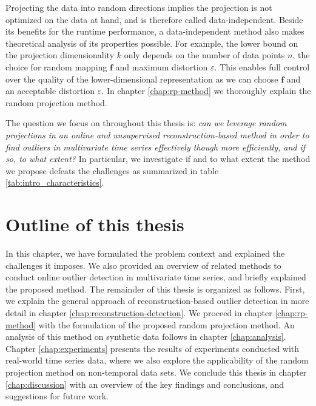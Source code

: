 Projecting the data into random directions implies the projection is not optimized on the data at hand, and is therefore called data-independent. Beside its benefits for the runtime performance, a data-independent method also makes theoretical analysis of its properties possible. For example, the lower bound on the projection dimensionality $k$ only depends on the number of data points $n$, the choice for random mapping $\mathbf{f}$ and maximum distortion $\varepsilon$. This enables full control over the quality of the lower-dimensional representation as we can choose $\mathbf{f}$ and an acceptable distortion $\varepsilon$. In chapter \ref{chap:rp-method} we thoroughly explain the random projection method.

The question we focus on throughout this thesis is: \textit{can we leverage random projections in an online and unsupervised reconstruction-based method in order to find outliers in multivariate time series effectively though more efficiently, and if so, to what extent?} 
In particular, we investigate if and to what extent the method we propose defeats the challenges as summarized in table \ref{tab:intro_characteristics}.


\section{Outline of this thesis}

In this chapter, we have formulated the problem context and explained the challenges it imposes. We also provided an overview of related methods to conduct online outlier detection in multivariate time series, and briefly explained the proposed method. The remainder of this thesis is organized as follows. First, we explain the general approach of reconstruction-based outlier detection in more detail in chapter \ref{chap:reconstruction-detection}. We proceed in chapter \ref{chap:rp-method} with the formulation of the proposed random projection method. An analysis of this method on synthetic data follows in chapter \ref{chap:analysis}. Chapter \ref{chap:experiments} presents the results of experiments conducted with real-world time series data, where we also explore the applicability of the random projection method on non-temporal data sets. We conclude this thesis in chapter \ref{chap:discussion} with an overview of the key findings and conclusions, and suggestions for future work.


